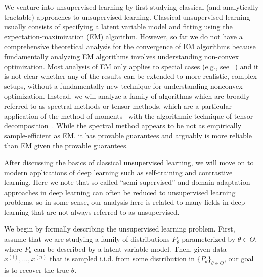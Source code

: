 
We venture into unsupervised learning by first studying classical (and analytically tractable) approaches to unsupervised learning. Classical unsupervised learning usually consists of specifying a latent variable model and fitting using the expectation-maximization (EM) algorithm. However, so far we do not have a comprehensive theoretical analysis for the convergence of EM algorithms because fundamentally analyzing EM algorithms involves understanding non-convex optimization. Most analysis of EM only applies to special cases (e.g., see ~\citet{xu2016global,daskalakis2016ten}) and it is not clear whether any of the results can be extended to more realistic, complex setups, without a fundamentally new technique for understanding nonconvex optimization. 
Instead, we will analyze a family of algorithms which are broadly referred to as spectral methods or tensor methods, which are a particular application of the method of moments~\citep{pearson1894} with the algorithmic technique of tensor decomposition~\citep{anandkumar2015learning}. While the spectral method appears to be not as empirically sample-efficient as EM, it has provable guarantees and arguably is more reliable than EM given the provable guarantees.

After discussing the basics of classical unsupervised learning, we will move on to modern applications of deep learning such as self-training and contrastive learning. Here we note that so-called ``semi-supervised'' and domain adaptation approaches in deep learning can often be reduced to unsupervised learning problems, so in some sense, our analysis here is related to many fields in deep learning that are not always referred to as unsupervised. 


We begin by formally describing the unsupervised learning problem. First, assume that we are studying a family of distributions $P_{\theta}$ parameterized by $\theta \in \Theta$, where $P_{\theta}$ can be described by a latent variable model. Then, given data $x^{(i)},...,x^{(n)}$ that is sampled i.i.d. from some distribution in $\{P_\theta\}_{\theta \in \Theta}$, our goal is to recover the true $\theta$. 

